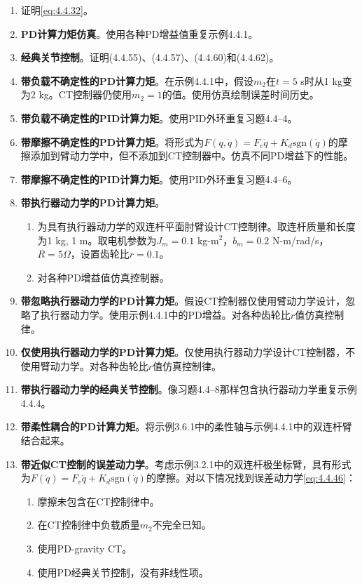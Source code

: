 \documentclass[UTF8]{ctexart}
\theoremstyle{definition}
\begin{document}
\begin{enumerate}[label=4.4--\arabic*, resume]
\item 证明\eqref{eq:4.4.32}。

\item \textbf{PD计算力矩仿真}。使用各种PD增益值重复示例4.4.1。

\item \textbf{经典关节控制}。证明(4.4.55)、(4.4.57)、(4.4.60)和(4.4.62)。

\item \textbf{带负载不确定性的PD计算力矩}。在示例4.4.1中，假设$m_2$在$t=5$ s时从1 kg变为2 kg。CT控制器仍使用$m_2=1$的值。使用仿真绘制误差时间历史。

\item \textbf{带负载不确定性的PID计算力矩}。使用PID外环重复习题4.4--4。

\item \textbf{带摩擦不确定性的PD计算力矩}。将形式为$F(q, \dot{q}) = F_v\dot{q} + K_d\text{sgn}(\dot{q})$的摩擦添加到臂动力学中，但不添加到CT控制器中。仿真不同PD增益下的性能。

\item \textbf{带摩擦不确定性的PID计算力矩}。使用PID外环重复习题4.4--6。

\item \textbf{带执行器动力学的PD计算力矩}。
\begin{enumerate}[label=(\alph*)]
\item 为具有执行器动力学的双连杆平面肘臂设计CT控制律。取连杆质量和长度为1 kg, 1 m。取电机参数为$J_m=0.1$ kg-m$^2$，$b_m=0.2$ N-m/rad/s，$R=5\Omega$，设置齿轮比$r=0.1$。
\item 对各种PD增益值仿真控制器。
\end{enumerate}

\item \textbf{带忽略执行器动力学的PD计算力矩}。假设CT控制器仅使用臂动力学设计，忽略了执行器动力学。使用示例4.4.1中的PD增益。对各种齿轮比$r$值仿真控制律。

\item \textbf{仅使用执行器动力学的PD计算力矩}。仅使用执行器动力学设计CT控制器，不使用臂动力学。对各种齿轮比$r$值仿真控制律。

\item \textbf{带执行器动力学的经典关节控制}。像习题4.4--8那样包含执行器动力学重复示例4.4.4。

\item \textbf{带柔性耦合的PD计算力矩}。将示例3.6.1中的柔性轴与示例4.4.1中的双连杆臂结合起来。

\item \textbf{带近似CT控制的误差动力学}。考虑示例3.2.1中的双连杆极坐标臂，具有形式为$F(\dot{q})=F_v\dot{q}+K_d\text{sgn}(\dot{q})$的摩擦。对以下情况找到误差动力学\eqref{eq:4.4.46}：
\begin{enumerate}[label=(\alph*)]
\item 摩擦未包含在CT控制律中。
\item 在CT控制律中负载质量$m_2$不完全已知。
\item 使用PD-gravity CT。
\item 使用PD经典关节控制，没有非线性项。
\end{enumerate}
\end{enumerate}
\end{document}
